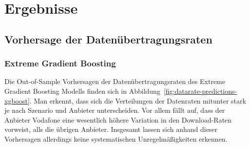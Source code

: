\section{Ergebnisse}

\subsection{Vorhersage der Daten\"ubertragungsraten}

\subsubsection{Extreme Gradient Boosting}

Die Out-of-Sample Vorhersagen der Da\-ten\"uber\-tra\-gungs\-ra\-ten des Ex\-tre\-me Gra\-di\-ent Boos\-ting Modells
finden sich in Abbildung~\ref{fig:datarate-predictions-xgboost}.
Man erkennt, dass sich die Verteilungen der Datenraten mitunter stark je nach Szenario und Anbieter unterscheiden.
Vor allem f\"allt auf, dass der Anbieter Vodafone eine wesentlich h\"ohere Variation in den Download-Raten vorweist,
alls die \"ubrigen Anbieter.
Insgesamt lassen sich anhand dieser Vorhersagen allerdings keine systematischen Unregelm\"a{\ss}igkeiten erkennen.
